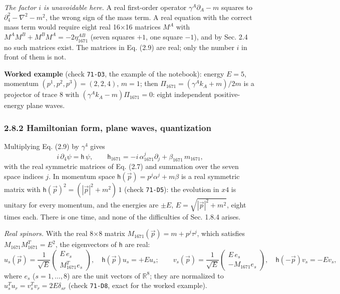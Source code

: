 \documentclass[
  10pt,
]{article}
\begin{document}
\emph{The factor \(i\) is unavoidable here.} A real first-order operator
\(\gamma^A\partial_A-m\) squares to \(\partial_4^2-\nabla^2-m^2\), the
wrong sign of the mass term. A real equation with the correct mass term
would require eight real 16×16 matrices \(M^A\) with
\(M^AM^B+M^BM^A=-2\eta_{1671}^{AB}\) (seven squares \(+1\), one square
\(-1\)), and by Sec. 2.4 no such matrices exist. The matrices in Eq.
(2.9) are real; only the number \(i\) in front of them is not.

\textbf{Worked example} (check \texttt{71-D3}, the example of the
notebook): energy \(E=5\), momentum \((p^1,p^2,p^3)=(2,2,4)\), \(m=1\);
then \(\Pi_{1671}=(\gamma^Ak_A+m)/2m\) is a projector of trace 8 with
\((\gamma^Ak_A-m)\Pi_{1671}=0\): eight independent positive-energy plane
waves.

\hypertarget{hamiltonian-form-plane-waves-quantization}{%
\subsubsection{2.8.2 Hamiltonian form, plane waves,
quantization}\label{hamiltonian-form-plane-waves-quantization}}

Multiplying Eq. (2.9) by \(\gamma^4\) gives
\[i\,\partial_4\psi=\mathsf{h}\,\psi,\qquad\mathsf{h}_{1671}=-i\,\alpha_{1671}^j\partial_j+\beta_{1671}\,m_{1671},\tag{2.11}\]
with the real symmetric matrices of Eq. (2.7) and summation over the
seven space indices \(j\). In momentum space
\(\mathsf{h}(\vec p)=p^j\alpha^j+m\beta\) is a real symmetric matrix
with \(\mathsf{h}(\vec p)^2=(|\vec p|^2+m^2)\,1\) (check
\texttt{71-D5}): the evolution in \(x4\) is unitary for every momentum,
and the energies are \(\pm E\), \(E=\sqrt{|\vec p|^2+m^2}\), eight times
each. There is one time, and none of the difficulties of Sec. 1.8.4
arises.

\emph{Real spinors.} With the real 8×8 matrix
\(M_{1671}(\vec p)=m+p^j\tau^j\), which satisfies
\(M_{1671}M_{1671}^T=E^2\), the eigenvectors of \(\mathsf{h}\) are real:
\[u_s(\vec p)=\frac1{\sqrt E}\begin{pmatrix}E\,e_s\\M_{1671}^Te_s\end{pmatrix},\quad\mathsf{h}(\vec p)u_s=+Eu_s;\qquad
v_s(\vec p)=\frac1{\sqrt E}\begin{pmatrix}E\,e_s\\-M_{1671}e_s\end{pmatrix},\quad\mathsf{h}(-\vec p)v_s=-Ev_s,\]
where \(e_s\) (\(s=1,\dots,8\)) are the unit vectors of
\(\mathbb{R}^8\); they are normalized to
\(u_s^Tu_r=v_s^Tv_r=2E\delta_{sr}\) (check \texttt{71-D8}, exact for the
worked example).
\end{document}
